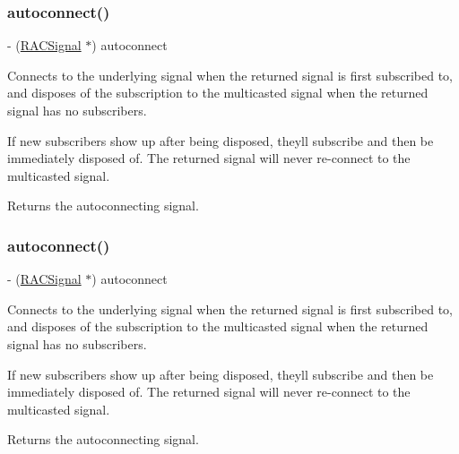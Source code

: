 \subsubsection{\texorpdfstring{autoconnect()}{autoconnect()}\hspace{0.1cm}{\footnotesize\ttfamily [2/3]}}
{\footnotesize\ttfamily -\/ (\mbox{\hyperlink{interface_r_a_c_signal}{R\+A\+C\+Signal}} $\ast$) autoconnect \begin{DoxyParamCaption}{ }\end{DoxyParamCaption}}

Connects to the underlying signal when the returned signal is first subscribed to, and disposes of the subscription to the multicasted signal when the returned signal has no subscribers.

If new subscribers show up after being disposed, they\textquotesingle{}ll subscribe and then be immediately disposed of. The returned signal will never re-\/connect to the multicasted signal.

Returns the autoconnecting signal. \mbox{\label{interface_r_a_c_multicast_connection_a9a2c385b945f926a9e89a5170bd41dc0}} 
\subsubsection{\texorpdfstring{autoconnect()}{autoconnect()}\hspace{0.1cm}{\footnotesize\ttfamily [3/3]}}
{\footnotesize\ttfamily -\/ (\mbox{\hyperlink{interface_r_a_c_signal}{R\+A\+C\+Signal}} $\ast$) autoconnect \begin{DoxyParamCaption}{ }\end{DoxyParamCaption}}

Connects to the underlying signal when the returned signal is first subscribed to, and disposes of the subscription to the multicasted signal when the returned signal has no subscribers.

If new subscribers show up after being disposed, they\textquotesingle{}ll subscribe and then be immediately disposed of. The returned signal will never re-\/connect to the multicasted signal.

Returns the autoconnecting signal. \mbox{\label{interface_r_a_c_multicast_connection_a62299415a12cbd53ba5fded7e89584ef}} 
